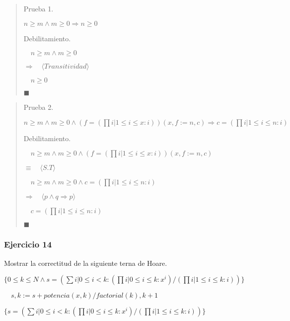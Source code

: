\documentclass[hidelinks]{article}
\newenvironment{absolutelynopagebreak}
{\Needspace{10\baselineskip}\begin{quote}}
		{\end{quote}}
\begin{document}
\begin{absolutelynopagebreak}
	Prueba 1.\par
	$n \geq m \land m \geq 0 \Rightarrow n \geq 0$\par

	Debilitamiento.\par
	$\quad n \geq m \land m \geq 0$\par
	$\Rightarrow \quad \langle Transitividad \rangle$\par
	$\quad n \geq  0$\par
	$\blacksquare$\par
\end{absolutelynopagebreak}

\begin{absolutelynopagebreak}
	Prueba 2.\par
	$n \geq m \land m \geq 0 \land (f = (\prod i| 1 \leq i \leq x: i))(x,f := n,c) \Rightarrow c = (\prod i| 1 \leq i \leq n : i)$\par

	Debilitamiento.\par
	$\quad n \geq m \land m \geq 0 \land (f = (\prod i| 1 \leq i \leq x: i))(x,f := n,c)$\par
	$\equiv \quad \langle S.T \rangle$\par
	$\quad n \geq m \land m \geq 0 \land c = (\prod i| 1 \leq i \leq n: i)$\par
	$\Rightarrow \quad \langle p \land q \Rightarrow p \rangle$\par
	$\quad c = (\prod i| 1 \leq i \leq n: i)$\par
	$\blacksquare$\par
\end{absolutelynopagebreak}

\newpage

\subsubsection{Ejercicio 14}


Mostrar la correctitud de la siguiente terna de Hoare.\par

$\{0 \leq k \leq N \land s = (\sum i| 0 \leq i < k: (\prod i| 0 \leq i \leq k : x^i) / (\prod i| 1 \leq i \leq k : i))\}$ \par
$\quad s,k := s + potencia(x,k)/factorial(k), k + 1$ \par
$\{ s = (\sum i| 0 \leq i < k: (\prod i| 0 \leq i \leq k : x^i) / (\prod i| 1 \leq i \leq k : i))\}$ \par
\end{document}
